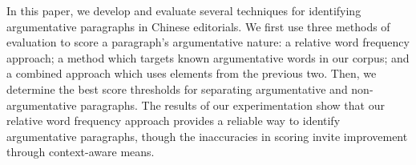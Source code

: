 In this paper, we develop and evaluate several techniques for identifying argumentative paragraphs in Chinese editorials. We first use three methods of evaluation to score a paragraph's argumentative nature: a relative word frequency approach; a method which targets known argumentative words in our corpus; and a combined approach which uses elements from the previous two. Then, we determine the best score thresholds for separating argumentative and non-argumentative paragraphs. The results of our experimentation show that our relative word frequency approach provides a reliable way to identify argumentative paragraphs, though the inaccuracies in scoring invite improvement through context-aware means.
